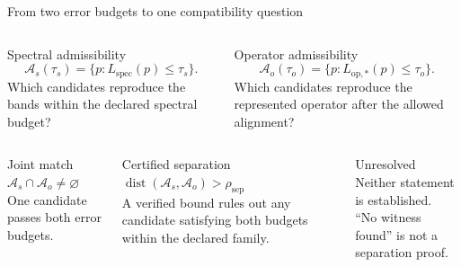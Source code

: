 \documentclass[aspectratio=169,10pt]{beamer}
\begin{document}
\begin{frame}{From two error budgets to one compatibility question}
  \small
  \begin{columns}[T]
      \begin{block}{Spectral admissibility}
        \[
          \mathcal A_s(\tau_s)
          =\{p:L_{\mathrm{spec}}(p)\le\tau_s\}.
        \]
        Which candidates reproduce the bands within the declared spectral budget?
      \end{block}
      \begin{exampleblock}{Operator admissibility}
        \[
          \mathcal A_o(\tau_o)
          =\{p:L_{\mathrm{op},*}(p)\le\tau_o\}.
        \]
        Which candidates reproduce the represented operator after the allowed alignment?
      \end{exampleblock}
  \end{columns}
  \vspace{0.45em}
  {
  \begin{columns}[T]
      \begin{block}{Joint match}
        \centering
        $\mathcal A_s\cap\mathcal A_o\ne\varnothing$\\[0.45em]
        One candidate passes both error budgets.
      \end{block}
      \begin{exampleblock}{Certified separation}
        \centering
        $\operatorname{dist}(\mathcal A_s,\mathcal A_o)>\rho_{\mathrm{sep}}$\\[0.45em]
        A verified bound rules out any candidate satisfying both budgets within the
        declared family.
      \end{exampleblock}
      \begin{alertblock}{Unresolved}
        \centering
        Neither statement is established.\\[0.45em]
        ``No witness found'' is not a separation proof.
      \end{alertblock}
  \end{columns}
  }
\end{frame}
\end{document}
